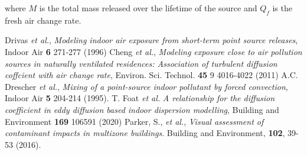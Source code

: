 \documentclass[]{article}
\begin{document}
\noindent where $M$ is the total mass released over the lifetime of the source
and $Q_f$ is the fresh air change rate.

\begin{thebibliography}{10}
     Drivas \emph{et al.}, \emph{Modeling indoor air exposure from
    short-term point source releases}, Indoor Air \textbf{6}
271-277 (1996)
 Cheng \emph{et al.}, \emph{Modeling exposure close to air pollution
sources in naturally ventilated residences: Association of turbulent diffusion
coffcient with air change rate}, Environ. Sci. Technol. \textbf{45} 9
4016-4022 (2011)
     A.C. Drescher \emph{et al.}, \emph{Mixing of a point-source
    indoor pollutant by forced convection}, Indoor Air \textbf{5}
    204-214 (1995).
     T. Foat \emph{et al.} \emph{A relationship for the diffusion coefficient
    in eddy diffusion based indoor dispersion modelling}, Building and
    Environment \textbf{169} 106591 (2020) 
     Parker, S., \emph{et al.}, \emph{Visual assessment
    of contaminant impacts in multizone buildings}. Building and Environment,
    \textbf{102}, 39-53 (2016).  
\end{thebibliography}
\end{document}
